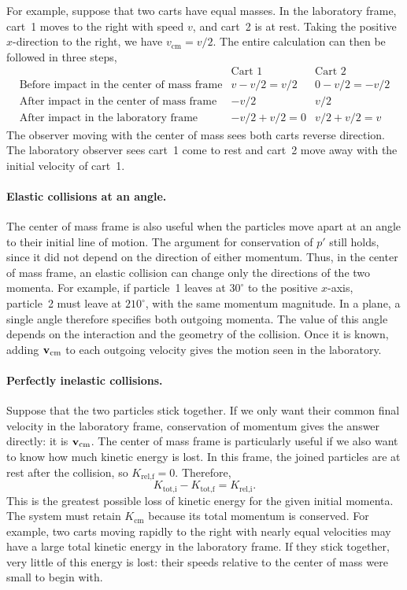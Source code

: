\documentclass[12pt]{article}
\begin{document}
For example, suppose that two carts have equal masses. In the laboratory frame, cart~1 moves to the right with speed $v$, and cart~2 is at rest. Taking the positive $x$-direction to the right, we have $v_{\text{cm}}=v/2$. The entire calculation can then be followed in three steps,
\[
\begin{array}{lcc}
    & \text{Cart 1} & \text{Cart 2} \\[2pt]
    \text{Before impact in the center of mass frame}
        & v-v/2= v/2 & 0-v/2=-v/2 \\[2pt]
    \text{After impact in the center of mass frame}
        & -v/2 & v/2 \\[2pt]
    \text{After impact in the laboratory frame}
        & -v/2+v/2=0 & v/2+v/2=v
\end{array}
\]
The observer moving with the center of mass sees both carts reverse direction. The laboratory observer sees cart~1 come to rest and cart~2 move away with the initial velocity of cart~1.

\paragraph{Elastic collisions at an angle.}
The center of mass frame is also useful when the particles move apart at an angle to their initial line of motion. The argument for conservation of $p'$ still holds, since it did not depend on the direction of either momentum. Thus, in the center of mass frame, an elastic collision can change only the directions of the two momenta. For example, if particle~1 leaves at $30^\circ$ to the positive $x$-axis, particle~2 must leave at $210^\circ$, with the same momentum magnitude. In a plane, a single angle therefore specifies both outgoing momenta. The value of this angle depends on the interaction and the geometry of the collision. Once it is known, adding $\vb{v}_{\text{cm}}$ to each outgoing velocity gives the motion seen in the laboratory.

\paragraph{Perfectly inelastic collisions.}
Suppose that the two particles stick together. If we only want their common final velocity in the laboratory frame, conservation of momentum gives the answer directly: it is $\vb{v}_{\text{cm}}$. The center of mass frame is particularly useful if we also want to know how much kinetic energy is lost. In this frame, the joined particles are at rest after the collision, so $K_{\text{rel,f}}=0$. Therefore,
\[
    \boxed{K_{\text{tot,i}}-K_{\text{tot,f}}=K_{\text{rel,i}}}.
\]
This is the greatest possible loss of kinetic energy for the given initial momenta. The system must retain $K_{\text{cm}}$ because its total momentum is conserved. For example, two carts moving rapidly to the right with nearly equal velocities may have a large total kinetic energy in the laboratory frame. If they stick together, very little of this energy is lost: their speeds relative to the center of mass were small to begin with.
\end{document}
